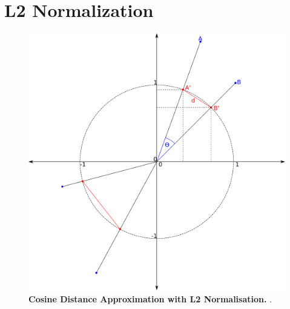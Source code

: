 \section{L2 Normalization} \label{sec:2.4}

\blindtext

\begin{figure}[!hbt]
    \includegraphics[width=\dimexpr\textwidth-2\fboxsep-2\fboxrule,fbox]{Extra_Graphics/L2_Euclidean.pdf}
    \caption[Cosine Distance Approximation with L2 Normalisation]{\textbf{Cosine Distance Approximation with L2 Normalisation.} .}
    \label{fig:2.4.1}
\end{figure}

